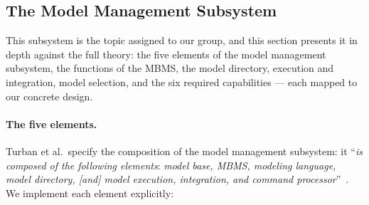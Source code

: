 \subsection{The Model Management Subsystem}

This subsystem is the topic assigned to our group, and this section presents it in depth against the full theory: the five elements of the model management subsystem, the functions of the MBMS, the model directory, execution and integration, model selection, and the six required capabilities --- each mapped to our concrete design.

\paragraph{The five elements.}
Turban et al.\ specify the composition of the model management subsystem: it ``\emph{is composed of the following elements}: \emph{model base, MBMS, modeling language, model directory, [and] model execution, integration, and command processor}''~\cite{turban2011}. We implement each element explicitly:

